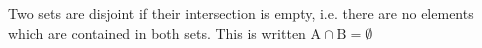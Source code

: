 Two sets are disjoint if their intersection is empty, i.e. there are no
elements which are contained in both sets. This is written $ \mathrm{A}
\cap \mathrm{B} = \emptyset $